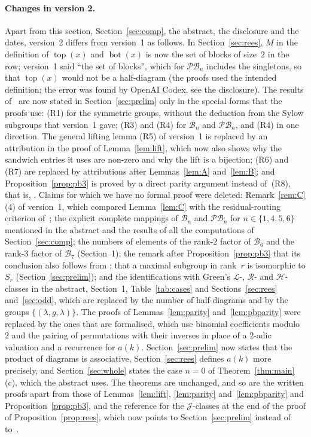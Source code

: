 \documentclass[11pt]{article}
\theoremstyle{remark}
\newcommand{\B}{\mathcal B}
\newcommand{\PB}{\mathcal{PB}}
\newcommand{\tp}{\operatorname{top}}
\newcommand{\bt}{\operatorname{bot}}
\begin{document}
\paragraph{Changes in version 2.}
Apart from this section, Section~\ref{sec:comp}, the abstract, the disclosure
and the dates, version~2 differs from version~1 as follows. In
Section~\ref{sec:rees}, $M$ in the definition of $\tp(x)$ and $\bt(x)$ is now
the set of blocks of size~$2$ in the row; version~1 said ``the set of blocks'',
which for $\PB_n$ includes the singletons, so that $\tp(x)$ would not be a
half-diagram (the proofs used the intended definition; the error was found by
OpenAI Codex, see the disclosure). The results of~\cite{abchk} are now stated
in Section~\ref{sec:prelim} only in the special forms that the proofs use:
(R1) for the symmetric groups, without the deduction from the Sylow subgroups
that version~1 gave; (R3) and (R4) for $\B_n$ and $\PB_n$, and (R4) in one
direction. The general lifting lemma (R5) of version~1 is replaced by an
attribution in the proof of Lemma~\ref{lem:lift}, which now also shows why the
sandwich entries it uses are non-zero and why the lift is a bijection; (R6)
and (R7) are replaced by attributions after Lemmas~\ref{lem:A}
and~\ref{lem:B}; and Proposition~\ref{prop:pb3} is proved by a direct parity
argument instead of~(R8), that is, \cite[Theorem~7.19]{abchk}. Claims for which
we have no formal proof were deleted: Remark~\ref{rem:C}(4) of version~1, which
compared Lemma~\ref{lem:C} with the residual-routing criterion
of~\cite[Definition~7.13 and Theorem~7.14]{abchk}; the explicit complete
mappings of $\B_n$ and $\PB_n$ for $n\in\{1,4,5,6\}$ mentioned in the abstract
and the results of all the computations of Section~\ref{sec:comp}; the numbers
of elements of the rank-$2$ factor of $\B_6$ and the rank-$3$ factor of $\B_7$
(Section~1); the remark after Proposition~\ref{prop:pb3} that its conclusion
also follows from \cite[Theorem~10.1]{abchk}; that a maximal subgroup in
rank~$r$ is isomorphic to $S_r$ (Section~\ref{sec:prelim}); and the
identifications with Green's $\mathcal L$-, $\mathcal R$- and $\mathcal
H$-classes in the abstract, Section~1, Table~\ref{tab:cases} and
Sections~\ref{sec:rees} and~\ref{sec:odd}, which are replaced by the number of
half-diagrams and by the groups $\{(\lambda,g,\lambda)\}$. The proofs of
Lemmas~\ref{lem:parity} and~\ref{lem:pbparity} were replaced by the ones that
are formalised, which use binomial coefficients modulo~$2$ and the pairing of
permutations with their inverses in place of a $2$-adic valuation and a
recurrence for $a(k)$. Section~\ref{sec:prelim} now states that the product of
diagrams is associative, Section~\ref{sec:rees} defines $a(k)$ more precisely,
and Section~\ref{sec:whole} states the case $n=0$ of
Theorem~\ref{thm:main}(c), which the abstract uses. The theorems are
unchanged, and so are the written proofs apart from those of
Lemmas~\ref{lem:lift}, \ref{lem:parity} and~\ref{lem:pbparity} and
Proposition~\ref{prop:pb3}, and the reference for the $\mathcal J$-classes
at the end of the proof of Proposition~\ref{prop:rees}, which now points to
Section~\ref{sec:prelim} instead of to~\cite{emrt}.
\end{document}
